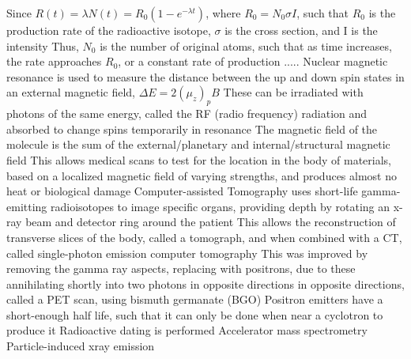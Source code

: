 \documentclass[11 pt, twoside]{article}
\newenvironment{outline*}
{
	\begin{outline}[enumerate]
	}
	{\end{outline}
}
\begin{document}
\begin{outline*}
	\2 Since $R(t) = \lambda N(t) = R_0 (1 - e^{-\lambda t})$, where $R_0 = N_0\sigma I$, such that $R_0$ is the production rate of the radioactive isotope, $\sigma$ is the cross section, and I is the intensity
		\3 Thus, $N_0$ is the number of original atoms, such that as time increases, the rate approaches $R_0$, or a constant rate of production .....
\1 Nuclear magnetic resonance is used to measure the distance between the up and down spin states in an external magnetic field, $\Delta E = 2(\mu_z)_pB$
	\2 These can be irradiated with photons of the same energy, called the RF (radio frequency) radiation and absorbed to change spins temporarily in resonance
	\2 The magnetic field of the molecule is the sum of the external/planetary and internal/structural magnetic field
	\2 This allows medical scans to test for the location in the body of materials, based on a localized magnetic field of varying strengths, and produces almost no heat or biological damage
\1 Computer-assisted Tomography uses short-life gamma-emitting radioisotopes to image specific organs, providing depth by rotating an x-ray beam and detector ring around the patient
	\2 This allows the reconstruction of transverse slices of the body, called a tomograph, and when combined with a CT, called single-photon emission computer tomography
	\2 This was improved by removing the gamma ray aspects, replacing with positrons, due to these annihilating shortly into two photons in opposite directions in opposite directions, called a PET scan, using bismuth germanate (BGO)
		\3 Positron emitters have a short-enough half life, such that it can only be done when near a cyclotron to produce it
\1 Radioactive dating is performed
\1 Accelerator mass spectrometry
\1 Particle-induced xray emission
\end{outline*} 
\end{document}
